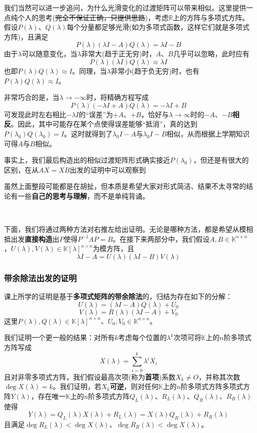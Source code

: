 \documentclass[a4paper,UTF8,fontset=windows,AutoFakeBold]{ctexart}
\newcommand*{\note}{\noindent *}
\begin{document}
我们当然可以进一步追问，为什么光滑变化的过渡矩阵可以带来相似。这里提供一点纯个人的思考(\sout{完全不保证正确，只提供思路})，考虑$\mathbb{R}$上的方阵与多项式方阵。假设$P(\lambda)$、$Q(\lambda)$每个分量都足够光滑(如为多项式函数，这样它们就是多项式方阵)，且满足
$$P(\lambda)(\lambda I-A)Q(\lambda)=\lambda I-B$$
由于$\lambda$可以随意变化，当$\lambda$非常大(趋于正无穷)时，$A$、$B$几乎可以忽略，此时应有
$$P(\lambda)(\lambda I)Q(\lambda)\approx\lambda I$$
也即$P(\lambda)Q(\lambda)\approx I$。同理，当$\lambda$非常小(趋于负无穷)时，也有$P(\lambda)Q(\lambda)\approx I$。

非常巧合的是，当$\lambda\to-\infty$时，将精确方程写成
$$P(\lambda)(-\lambda I+A)Q(\lambda)=-\lambda I+B$$
可发现此时左右相比$-\lambda I$的``误差''为$+A$、$+B$，恰好与$\lambda\to\infty$时的$-A$、$-B$\textbf{相反}。因此，其中可能存在某个点使得误差能够``抵消''，真的达到$P(\lambda_0)Q(\lambda_0)=I$。这时就得到了$\lambda_0I-A$与$\lambda_0I-B$相似，从而根据上学期知识可得$A$与$B$相似。

\note 事实上，我们最后构造出的相似过渡矩阵形式确实接近$P(\lambda_0)$，但还是有很大的区别，在从$AX=XB$出发的证明中可以观察到

\note 虽然上面整段可能都是在胡扯，但本质是希望大家对形式简洁、结果不太寻常的结论有一些\textbf{自己的思考与理解}，而不是单纯背诵。

\

下面，我们将通过两种方法对右推左给出证明。无论是哪种方法，都是希望从模相抵出发\textbf{直接构造}出$P$使得$P^{-1}AP=B$。在接下来两部分中，我们假设$A,B\in\mathbb{K}^{n\times n}$，$U(\lambda),V(\lambda)\in\mathbb{K}[\lambda]^{n\times n}$为模方阵，且
$$\lambda I-A=U(\lambda)(\lambda I-B)V(\lambda)$$

\subsubsection{带余除法出发的证明}
课上所学的证明是基于\textbf{多项式矩阵的带余除法}的，归结为存在如下的分解：
$$U(\lambda)=(\lambda I-A)Q(\lambda)+U_0$$
$$V(\lambda)=R(\lambda)(\lambda I-A)+V_0$$
这里$P(\lambda),Q(\lambda)\in\mathbb{K}[\lambda]^{n\times n}$、$U_0,V_0\in\mathbb{K}^{n\times n}$。

我们证明一个更一般的结果：对所有$k$考虑每个位置的$\lambda^k$次项可将$\mathbb{K}$上的$n$阶多项式方阵写成
$$X(\lambda)=\sum_{i=0}^k\lambda^iX_i$$
且对非零多项式方阵，我们假设最高次项(称为\textbf{首项})系数$X_k\ne O$，并称其次数$\deg X(\lambda)=k$。我们证明，若$X_k$\textbf{可逆}，则对任何$\mathbb{K}$上的$n$阶多项式方阵多项式方阵$Y(\lambda)$，存在唯一$\mathbb{K}$上的$n$阶多项式方阵$Q_L(\lambda)$、$R_L(\lambda)$、$Q_R(\lambda)$、$R_R(\lambda)$使得
$$Y(\lambda)=Q_L(\lambda)X(\lambda)+R_L(\lambda)=X(\lambda)Q_R(\lambda)+R_R(\lambda)$$
且满足$\deg R_L(\lambda)<\deg X(\lambda)$、$\deg R_R(\lambda)<\deg X(\lambda)$。
\end{document}
